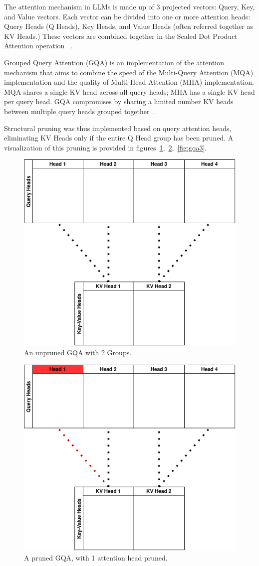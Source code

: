 \documentclass[conference]{IEEEtran}
\begin{document}
    The attention mechanism in LLMs is made up of 3 projected vectors: Query, Key, and Value vectors.
    Each vector can be divided into one or more attention heads: Query Heads (Q Heads), Key Heads, and Value Heads
    (often referred together as KV Heads.)
    These vectors are combined together in the Scaled Dot Product Attention operation ~\cite{vaswani2023attentionneed}.

    Grouped Query Attention (GQA) is an implementation of the attention mechanism that aims to combine the speed of
    the Multi-Query Attention (MQA) implementation and the quality of Multi-Head Attention (MHA) implementation.
    MQA shares a single KV head across all query heads; MHA has a single KV head per query head.
    GQA compromises by sharing a limited number KV heads between multiple query heads grouped together~\cite{ainslie2023gqatraininggeneralizedmultiquery}.

    Structural pruning was thus implemented based on query attention heads, eliminating KV Heads only if the entire Q Head group has been pruned.
    A visualization of this pruning is provided in figures~\ref{fig:gqa1},~\ref{fig:gqa2},~\ref{fig:gqa3}.

    \begin{figure}[!htbp]
        \centerline{\includegraphics[width=0.66\columnwidth]{Unpruned GQA}}
        \caption{An unpruned GQA with 2 Groups.}
        \label{fig:gqa1}
    \end{figure}

    \begin{figure}[!htbp]
        \centerline{\includegraphics[width=0.66\columnwidth]{Pruned GQA 1}}
        \caption{A pruned GQA, with 1 attention head pruned.}
        \label{fig:gqa2}
    \end{figure}
\end{document}
